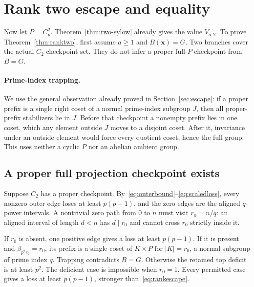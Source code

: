 \documentclass[11pt,letterpaper]{article}
\theoremstyle{definition}\newtheorem{definition}{Definition}
\begin{document}
\section{Rank two escape and equality}\label{sec:ranktwo}
Now let $P=C_p^2$. Theorem~\ref{thm:two-sylow} already gives the value $V_{a,2}$. To prove Theorem~\ref{thm:ranktwo}, first assume $a\ge1$ and $B(\mathbf{x})=G$. Two branches cover the actual $C_2$ checkpoint set. They do not infer a proper full-$P$ checkpoint from $B=G$.

\paragraph{Prime-index trapping.}
We use the general observation already proved in Section~\ref{sec:escape}: if a proper prefix is a single right coset of a normal prime-index subgroup $J$, then all proper-prefix stabilizers lie in $J$. Before that checkpoint a nonempty prefix lies in one coset, which any element outside $J$ moves to a disjoint coset. After it, invariance under an outside element would force every quotient coset, hence the full group. This uses neither a cyclic $P$ nor an abelian ambient group.

\subsection{A proper full projection checkpoint exists}
Suppose $C_2$ has a proper checkpoint. By~\eqref{eq:outerbound}--\eqref{eq:scaledloss}, every nonzero outer edge loses at least $p(p-1)$, and the zero edges are the aligned $q$-power intervals. A nontrivial zero path from $0$ to $n$ must visit $r_0=n/q$: an aligned interval of length $d<n$ has $d\mid r_0$ and cannot cross $r_0$ strictly inside it.

If $r_0$ is absent, one positive edge gives a loss at least $p(p-1)$. If it is present and $\beta_{p^2r_0}=r_0$, its prefix is a single coset of $K\times P$ for $|K|=r_0$, a normal subgroup of prime index $q$. Trapping contradicts $B=G$. Otherwise the retained top deficit is at least $p^2$. The deficient case is impossible when $r_0=1$. Every permitted case gives a loss at least $p(p-1)$, stronger than~\eqref{eq:rankescape}.
\end{document}
